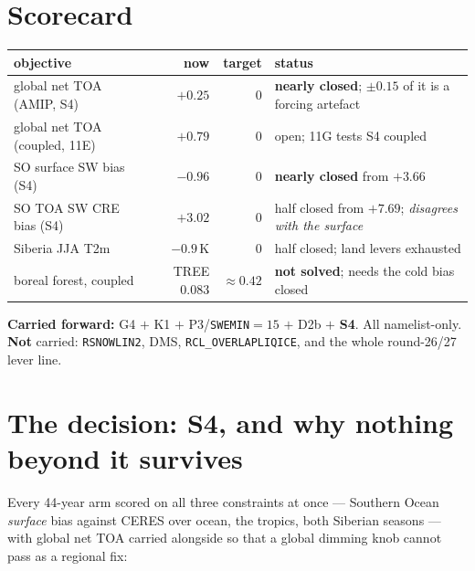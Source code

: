 \documentclass[10pt]{article}
\begin{document}
\section{Scorecard}\label{sec:score}

\begin{center}\footnotesize
\begin{tabular}{l r r l}
\toprule
objective & now & target & status \\
\midrule
global net TOA (AMIP, S4) & $+0.25$ & $0$ & \textbf{nearly closed}; $\pm0.15$ of it is a forcing artefact \\
global net TOA (coupled, 11E) & $+0.79$ & $0$ & open; 11G tests S4 coupled \\
SO surface SW bias (S4) & $-0.96$ & $0$ & \textbf{nearly closed} from $+3.66$ \\
SO TOA SW CRE bias (S4) & $+3.02$ & $0$ & half closed from $+7.69$; \emph{disagrees with the surface} \\
Siberia JJA T2m & $-0.9$\,K & $0$ & half closed; land levers exhausted \\
boreal forest, coupled & TREE $0.083$ & ${\approx}0.42$ & \textbf{not solved}; needs the cold bias closed \\
\bottomrule
\end{tabular}
\end{center}

\noindent \textbf{Carried forward:} G4 $+$ K1 $+$ P3/\texttt{SWEMIN}$=15$ $+$ D2b $+$
\textbf{S4}. All namelist-only. \textbf{Not} carried: \texttt{RSNOWLIN2}, DMS,
\texttt{RCL\_OVERLAPLIQICE}, and the whole round-26/27 lever line.

\section{The decision: S4, and why nothing beyond it survives}\label{sec:decision}

Every 44-year arm scored on all three constraints at once --- Southern Ocean
\emph{surface} bias against CERES over ocean, the tropics, both Siberian seasons --- with
global net TOA carried alongside so that a global dimming knob cannot pass as a regional
fix:
\end{document}
